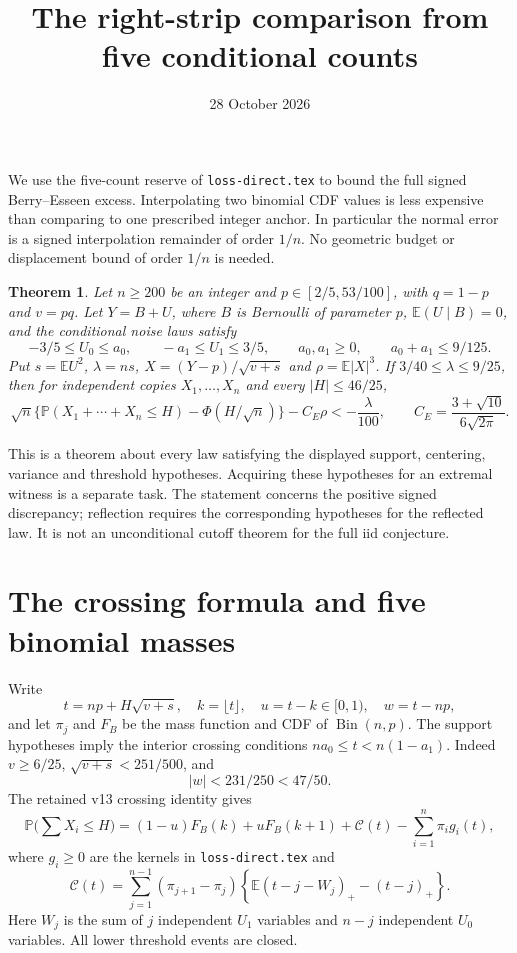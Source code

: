 \documentclass[11pt]{article}
\title{The right-strip comparison from five conditional counts}
\author{}\date{28 October 2026}
\newtheorem{theorem}{Theorem}\newtheorem{lemma}[theorem]{Lemma}
\newcommand{\E}{\mathbb E}\newcommand{\Pp}{\mathbb P}
\begin{document}
\maketitle

We use the five-count reserve of \texttt{loss-direct.tex} to bound the full
signed Berry--Esseen excess. Interpolating two binomial CDF values is
less expensive than comparing to one prescribed integer anchor. In
particular the normal error is a signed interpolation remainder of order
$1/n$. No geometric budget or displacement bound of order $1/n$ is needed.

\begin{theorem}\label{thm:right}
Let $n\ge200$ be an integer and $p\in[2/5,53/100]$, with $q=1-p$ and
$v=pq$. Let $Y=B+U$, where $B$ is Bernoulli of parameter $p$,
$\E(U\mid B)=0$, and the conditional noise laws satisfy
\[
 -3/5\le U_0\le a_0,\qquad -a_1\le U_1\le3/5,
 \qquad a_0,a_1\ge0,\qquad a_0+a_1\le9/125.
\]
Put $s=\E U^2$, $\lambda=ns$, $X=(Y-p)/\sqrt{v+s}$ and
$\rho=\E|X|^3$. If $3/40\le\lambda\le9/25$, then for independent
copies $X_1,\ldots,X_n$ and every $|H|\le46/25$,
\[
 \sqrt n\{\Pp(X_1+\cdots+X_n\le H)-\Phi(H/\sqrt n)\}
                 -C_E\rho<-\frac{\lambda}{100},
 \qquad C_E=\frac{3+\sqrt{10}}{6\sqrt{2\pi}}.
\]
\end{theorem}

This is a theorem about every law satisfying the displayed support,
centering, variance and threshold hypotheses. Acquiring these hypotheses
for an extremal witness is a separate task. The statement concerns the
positive signed discrepancy; reflection requires the corresponding
hypotheses for the reflected law. It is not an unconditional cutoff
theorem for the full iid conjecture.

\section{The crossing formula and five binomial masses}
Write
\[
 t=np+H\sqrt{v+s},\quad k=\lfloor t\rfloor,\quad u=t-k\in[0,1),
 \quad w=t-np,
\]
and let $\pi_j$ and $F_B$ be the mass function and CDF of
$\operatorname{Bin}(n,p)$. The support hypotheses imply the interior
crossing conditions $na_0\le t<n(1-a_1)$.
Indeed $v\ge6/25$, $\sqrt{v+s}<251/500$, and
\begin{equation}\label{eq:w}
 |w|<231/250<47/50.
\end{equation}
The retained v13 crossing identity gives
\begin{equation}\label{eq:cross}
 \Pp\Big(\sum X_i\le H\Big)
 =(1-u)F_B(k)+uF_B(k+1)+\mathcal C(t)-\sum_{i=1}^n\pi_i g_i(t),
\end{equation}
where $g_i\ge0$ are the kernels in \texttt{loss-direct.tex} and
\[
 \mathcal C(t)=\sum_{j=1}^{n-1}(\pi_{j+1}-\pi_j)
 \left\{\E(t-j-W_j)_+-(t-j)_+\right\}.
\]
Here $W_j$ is the sum of $j$ independent $U_1$ variables and $n-j$
independent $U_0$ variables. All lower threshold events are closed.
\end{document}
